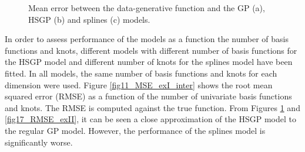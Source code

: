 \documentclass[]{interact}
\theoremstyle{plain}%
\theoremstyle{definition}
\theoremstyle{remark}
\begin{document}
\begin{figure}
\caption{Mean error between the data-generative function and the GP (a), HSGP (b) and splines (c) models.}
  \label{fig16_errors_exII}
\end{figure}

In order to assess performance of the models as a function the number of basis functions and knots, different models with different number of basis functions for the HSGP model and different number of knots for the splines model have been fitted. In all models, the same number of basis functions and knots for each dimension were used. Figure \ref{fig11_MSE_exI_inter} shows the root mean squared error (RMSE) as a function of the number of univariate basis functions and knots. The RMSE is computed against the true function. From Figures \ref{fig16_errors_exII} and \ref{fig17_RMSE_exII}, it can be seen a close approximation of the HSGP model to the regular GP model. However, the performance of the splines model is significantly worse.
\end{document}
